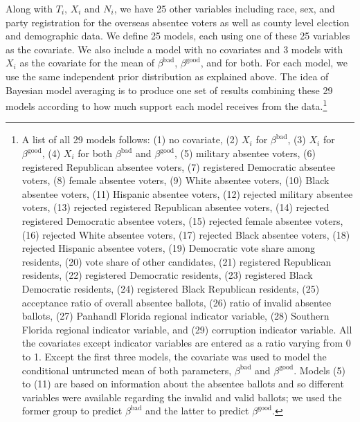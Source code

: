 \documentclass[11pt,titlepage]{article}
\newcommand{\bb}{\beta^{\text{bad}}}
\newcommand{\bg}{\beta^{\text{good}}}
\begin{document}
Along with $T_i$, $X_i$ and $N_i$, we have 25 other variables
including race, sex, and party registration for the overseas absentee
voters as well as county level election and demographic data.  We
define 25 models, each using one of these 25 variables as the
covariate.  We also include a model with no covariates and 3 models
with $X_i$ as the covariate for the mean of $\bb$, $\bg$, and for
both.  For each model, we use the same independent prior distribution
as explained above. The idea of Bayesian model averaging is to produce
one set of results combining these 29 models according to how much
support each model receives from the data.\footnote{A list of all 29
  models follows: (1) no covariate, (2) $X_i$ for $\bb$, (3) $X_i$ for
  $\bg$, (4) $X_i$ for both $\bb$ and $\bg$, (5) military absentee
  voters, (6) registered Republican absentee voters, (7) registered
  Democratic absentee voters, (8) female absentee voters, (9) White
  absentee voters, (10) Black absentee voters, (11) Hispanic absentee
  voters, (12) rejected military absentee voters, (13) rejected
  registered Republican absentee voters, (14) rejected registered
  Democratic absentee voters, (15) rejected female absentee voters,
  (16) rejected White absentee voters, (17) rejected Black absentee
  voters, (18) rejected Hispanic absentee voters, (19) Democratic vote
  share among residents, (20) vote share of other candidates, (21)
  registered Republican residents, (22) registered Democratic
  residents, (23) registered Black Democratic residents, (24)
  registered Black Republican residents, (25) acceptance ratio of
  overall absentee ballots, (26) ratio of invalid absentee ballots,
  (27) Panhandl Florida regional indicator variable, (28) Southern
  Florida regional indicator variable, and (29) corruption indicator
  variable. All the covariates except indicator variables are entered
  as a ratio varying from 0 to 1. Except the first three models, the
  covariate was used to model the conditional untruncted mean of both
  parameters, $\bb$ and $\bg$.  Models (5) to (11) are based on
  information about the absentee ballots and so different variables
  were available regarding the invalid and valid ballots; we used the
  former group to predict $\bb$ and the latter to predict $\bg$.}
\end{document}
